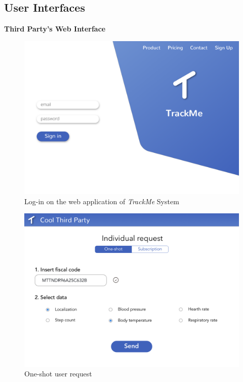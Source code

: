 \subsection{User Interfaces}

\textbf{Third Party's Web Interface}

\begin{figure}[H]
    \centering
    \includegraphics[scale=0.25]{Pictures/Mockup/web/login.png}
    \caption{Log-in on the web application of  \emph{TrackMe} System}
\end{figure}

\begin{figure}[H]
    \centering
    \includegraphics[scale=0.25]{Pictures/Mockup/web/individual1.png}
    \caption{One-shot user request}
\end{figure}


